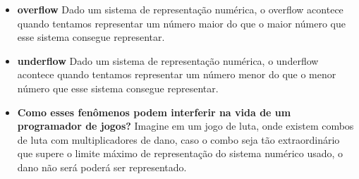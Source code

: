 \documentclass{article}
\begin{document}
\begin{enumerate}
\begin{enumerate}
\begin{itemize}
            \item \textbf{overflow} \linebreak
            Dado um sistema de representação numérica, o overflow acontece quando tentamos representar um número maior do que o maior número que esse sistema consegue representar.
            \item \textbf{underflow} \linebreak
            Dado um sistema de representação numérica, o underflow acontece quando tentamos representar um número menor do que o menor número que esse sistema consegue representar.
            \item \textbf{Como esses fenômenos podem interferir na vida de um programador de jogos?} \linebreak
            Imagine em um jogo de luta, onde existem combos de luta com multiplicadores de dano, caso o combo seja tão extraordinário que supere o limite máximo de representação do sistema numérico usado, o dano não será poderá ser representado.
          \end{itemize}
        \end{enumerate}
      \end{enumerate}
\end{document}
